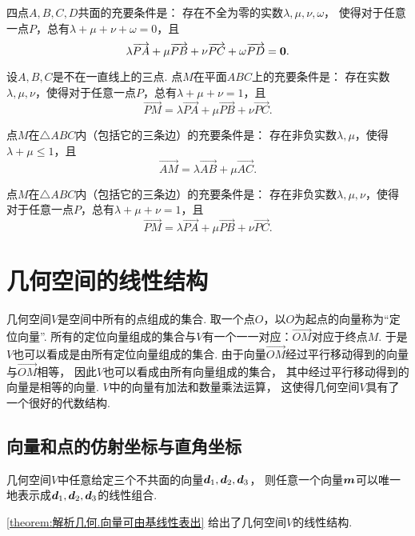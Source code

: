 \begin{theorem}
四点\(A,B,C,D\)共面的充要条件是：
存在不全为零的实数\(\lambda,\mu,\nu,\omega\)，
使得对于任意一点\(P\)，总有\(\lambda+\mu+\nu+\omega=0\)，且\[
\lambda \overrightarrow{PA} + \mu \overrightarrow{PB} + \nu \overrightarrow{PC} + \omega \overrightarrow{PD} = \boldsymbol{0}.
\]
\end{theorem}

\begin{theorem}
设\(A,B,C\)是不在一直线上的三点.
点\(M\)在平面\(ABC\)上的充要条件是：
存在实数\(\lambda,\mu,\nu\)，使得对于任意一点\(P\)，总有\(\lambda+\mu+\nu=1\)，且\[
\vec{PM} = \lambda \vec{PA} + \mu \vec{PB} + \nu \vec{PC}.
\]
\end{theorem}

\begin{theorem}
点\(M\)在\(\triangle ABC\)内（包括它的三条边）的充要条件是：
存在非负实数\(\lambda,\mu\)，使得\(\lambda+\mu\leq1\)，且\[
\vec{AM} = \lambda \vec{AB} + \mu \vec{AC}.
\]
\end{theorem}

\begin{theorem}
点\(M\)在\(\triangle ABC\)内（包括它的三条边）的充要条件是：
存在非负实数\(\lambda,\mu,\nu\)，使得对于任意一点\(P\)，总有\(\lambda+\mu+\nu=1\)，且\[
\vec{PM} = \lambda \vec{PA} + \mu \vec{PB} + \nu \vec{PC}.
\]
\end{theorem}

\section{几何空间的线性结构}
几何空间\(V\)是空间中所有的点组成的集合.
取一个点\(O\)，以\(O\)为起点的向量称为“定位向量”.
所有的定位向量组成的集合与\(V\)有一个一一对应：\(\vec{OM}\)对应于终点\(M\).
于是\(V\)也可以看成是由所有定位向量组成的集合.
由于向量\(\vec{OM}\)经过平行移动得到的向量与\(\vec{OM}\)相等，
因此\(V\)也可以看成由所有向量组成的集合，
其中经过平行移动得到的向量是相等的向量.
\(V\)中的向量有加法和数量乘法运算，
这使得几何空间\(V\)具有了一个很好的代数结构.

\subsection{向量和点的仿射坐标与直角坐标}
\begin{theorem}\label{theorem:解析几何.向量可由基线性表出}
几何空间\(V\)中任意给定三个不共面的向量\(\boldsymbol{d}_1,\boldsymbol{d}_2,\boldsymbol{d}_3\)，
则任意一个向量\(\boldsymbol{m}\)可以唯一地表示成\(\boldsymbol{d}_1,\boldsymbol{d}_2,\boldsymbol{d}_3\)的线性组合.
\end{theorem}
\cref{theorem:解析几何.向量可由基线性表出} 给出了几何空间\(V\)的线性结构.

